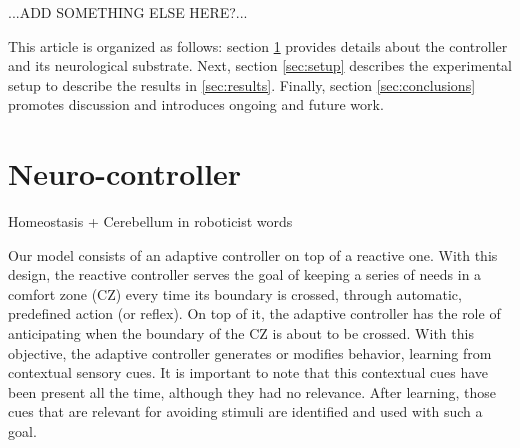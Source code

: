 \documentclass[letterpaper, 10 pt, conference]{ieeeconf}  %
\begin{document}
...ADD SOMETHING ELSE HERE?...


This article is organized as follows: section \ref{sec:neuro} provides details about the controller and its neurological substrate. Next, section \ref{sec:setup} describes the experimental setup to describe the results in \ref{sec:results}. Finally, section \ref{sec:conclusions} promotes discussion and introduces ongoing and future work. 



\section{Neuro-controller}
\label{sec:neuro}
Homeostasis + Cerebellum in roboticist words

Our model consists of an adaptive controller on top of a reactive one. With this design, the reactive controller serves the goal of keeping a series of needs in a comfort zone (CZ) every time its boundary is crossed, through automatic, predefined action (or reflex). On top of it, the adaptive controller has the role of anticipating when the boundary of the CZ is about to be crossed. With this objective, the adaptive controller generates or modifies behavior, learning from contextual sensory cues. It is important to note that this contextual cues have been present all the time, although they had no relevance. After learning, those cues that are relevant for avoiding stimuli are identified and used with such a goal. 
\end{document}
